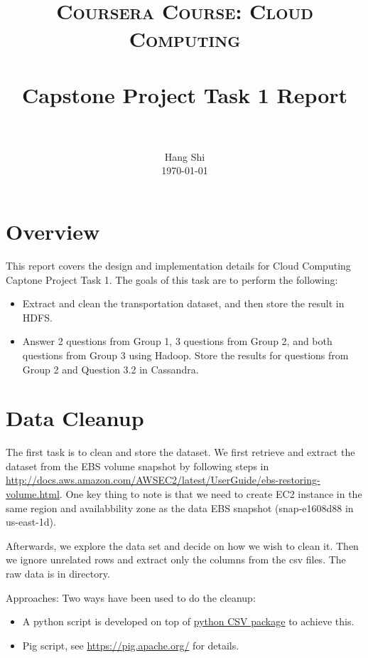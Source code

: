 \documentclass[fontsize=11pt,paper=a4]{scrartcl}
\title{
		\usefont{OT1}{bch}{b}{n}
		\normalfont \normalsize \textsc
		{Coursera Course: Cloud Computing} \\ [25pt]
		\horrule{0.5pt} \\[0.4cm]
		\huge Capstone Project Task 1 Report \\
		\horrule{2pt} \\[0.5cm]
}
\author{
		\normalfont 	\normalsize
        Hang Shi\\[-3pt] \normalsize
        \today
}
\date{}
\begin{document}
\maketitle


\section{Overview}
This report covers the design and implementation details for Cloud Computing Captone Project Task 1. The goals of this task are to perform the following:
\begin{itemize}
\item Extract and clean the transportation dataset, and then store the result in HDFS.
\item Answer 2 questions from Group 1, 3 questions from Group 2, and both questions from Group 3 using Hadoop. Store the results for questions from Group 2 and Question 3.2 in Cassandra.   
\end{itemize}
 
\section{Data Cleanup}
\par The first task is to clean and store the dataset. We  first retrieve and extract the dataset from the EBS volume snapshot by following steps in \url{http://docs.aws.amazon.com/AWSEC2/latest/UserGuide/ebs-restoring-volume.html}. One key thing to note is that we need to create EC2 instance in the same region and availabbility zone as the data EBS snapshot (snap-e1608d88 in us-east-1d).   
\par Afterwards, we explore the data set and decide on how we wish to clean it. Then we ignore unrelated rows and extract only the columns from the csv files. The raw data is in  directory. 
\par Approaches: Two ways have been used to do the cleanup: 
\begin{itemize} 
\item A python script is developed on top of \href{https://docs.python.org/2/library/csv.html}{python CSV package} to achieve this. 
\item Pig script, see \url{https://pig.apache.org/} for details. 
\end{itemize}
\end{document}
